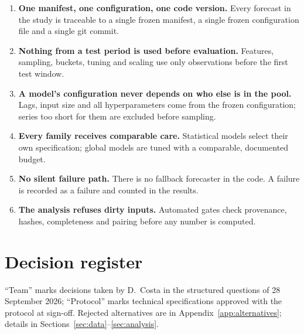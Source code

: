 \documentclass[11pt,a4paper]{article}
\begin{document}
\begin{enumerate}[label=\textbf{P\arabic*}]
  \item \textbf{One manifest, one configuration, one code version.} Every forecast in the study is
  traceable to a single frozen manifest, a single frozen configuration file and a single git commit.
  \item \textbf{Nothing from a test period is used before evaluation.} Features, sampling, buckets,
  tuning and scaling use only observations before the first test window.
  \item \textbf{A model's configuration never depends on who else is in the pool.} Lags, input size
  and all hyperparameters come from the frozen configuration; series too short for them are excluded
  before sampling.
  \item \textbf{Every family receives comparable care.} Statistical models select their own
  specification; global models are tuned with a comparable, documented budget.
  \item \textbf{No silent failure path.} There is no fallback forecaster in the code. A failure is
  recorded as a failure and counted in the results.
  \item \textbf{The analysis refuses dirty inputs.} Automated gates check provenance, hashes,
  completeness and pairing before any number is computed.
\end{enumerate}

\section{Decision register}\label{sec:decisions}

``Team'' marks decisions taken by D.\ Costa in the structured questions of 28 September 2026;
``Protocol'' marks technical specifications approved with the protocol at sign-off. Rejected
alternatives are in Appendix~\ref{app:alternatives}; details in
Sections~\ref{sec:data}--\ref{sec:analysis}.
\end{document}
